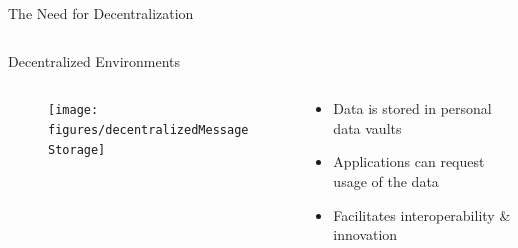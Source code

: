 \begin{frame}{The Need for Decentralization}
\begin{columns}[T]
\begin{column}{.48\textwidth}
\begin{itemize}
            \end{itemize}
        \end{column}%
    \end{columns}
\end{frame}

\begin{frame}{Decentralized Environments}
    \begin{columns}[T] %
        \begin{column}{.48\textwidth}
        
            \begin{figure}
                \centering
                \texttt{[image: figures/decentralizedMessageStorage]}
            \end{figure}
        
        \end{column}%
        \hfill%
        \begin{column}{.48\textwidth}
            \bigskip
            \begin{itemize}
                \item Data is stored in personal data vaults
                \item Applications can request usage of the data
                \item Facilitates interoperability \& innovation
            \end{itemize}
        \end{column}%
    \end{columns}
\end{frame}


